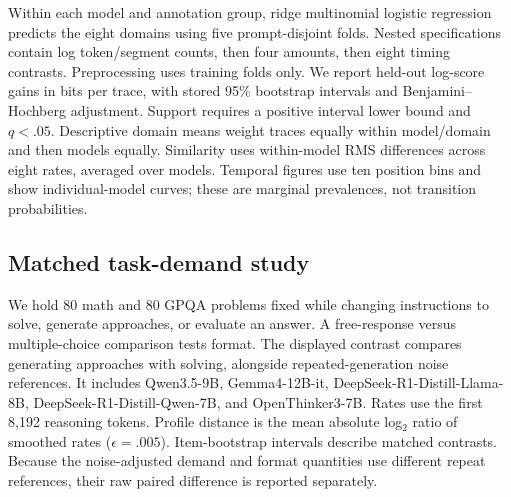 Within each model and annotation group, ridge multinomial logistic regression predicts the eight domains using five prompt-disjoint folds. Nested specifications contain log token/segment counts, then four amounts, then eight timing contrasts. Preprocessing uses training folds only. We report held-out log-score gains in bits per trace, with stored 95\% bootstrap intervals and Benjamini--Hochberg adjustment. Support requires a positive interval lower bound and $q<.05$. Descriptive domain means weight traces equally within model/domain and then models equally. Similarity uses within-model RMS differences across eight rates, averaged over models. Temporal figures use ten position bins and show individual-model curves; these are marginal prevalences, not transition probabilities.

\subsection{Matched task-demand study}
We hold 80 math and 80 GPQA problems fixed while changing instructions to solve, generate approaches, or evaluate an answer. A free-response versus multiple-choice comparison tests format. The displayed contrast compares generating approaches with solving, alongside repeated-generation noise references. It includes Qwen3.5-9B, Gemma4-12B-it, DeepSeek-R1-Distill-Llama-8B, DeepSeek-R1-Distill-Qwen-7B, and OpenThinker3-7B. Rates use the first 8,192 reasoning tokens. Profile distance is the mean absolute log$_2$ ratio of smoothed rates ($\epsilon=.005$). Item-bootstrap intervals describe matched contrasts. Because the noise-adjusted demand and format quantities use different repeat references, their raw paired difference is reported separately.
